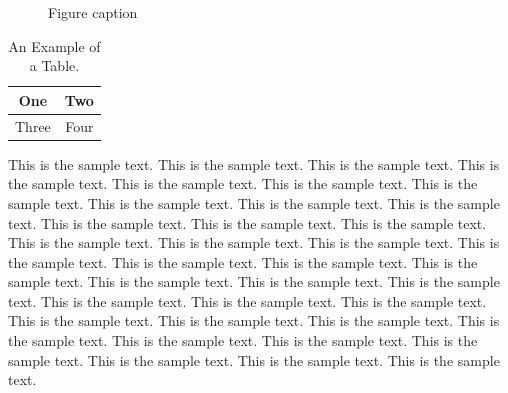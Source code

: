 \documentclass[preprint,pteplogo]{ptephy_v2}%
\begin{document}
\begin{figure}[!h]
\caption{Figure caption}
\end{figure}

\begin{table}[!h]
\caption{An Example of a Table.}%
\label{table_example_c}
\centering
\begin{tabular}{|c||c|}%
\hline
One & Two\\ %
\hline
Three & Four\\%
\hline
\end{tabular}
\end{table}%

This is the sample text. This is the sample text. This is the sample text. This is the sample text.
This is the sample text. This is the sample text. This is the sample text. This is the sample text.
This is the sample text. This is the sample text. This is the sample text. This is the sample text.
This is the sample text. This is the sample text. This is the sample text. This is the sample text.
This is the sample text. This is the sample text. This is the sample text. This is the sample text.
This is the sample text. This is the sample text. This is the sample text. This is the sample text.
This is the sample text. This is the sample text. This is the sample text. This is the sample text.
This is the sample text. This is the sample text. This is the sample text. This is the sample text.
This is the sample text. This is the sample text. This is the sample text. This is the sample text.
\end{document}
